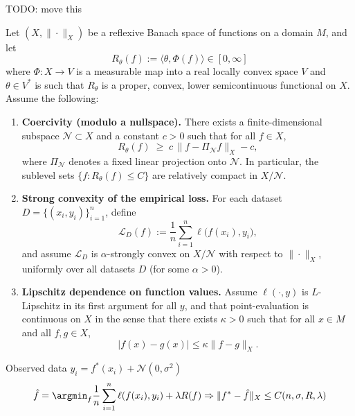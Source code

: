 TODO: move this

\begin{theorem}
	\label{thm:stability-coercive-phi}
	Let $(X,\|\cdot\|_X)$ be a reflexive Banach space of functions on a domain $M$, and let
	\[
		R_\theta(f) := \langle \theta, \Phi(f) \rangle \in [0,\infty]
	\]
	where $\Phi:X\to V$ is a measurable map into a real locally convex space $V$ and $\theta\in V^\ast$ is such that $R_\theta$ is a proper, convex, lower semicontinuous functional on $X$.
	Assume the following:

	\begin{enumerate}
		\item \textbf{Coercivity (modulo a nullspace).}
		      There exists a finite-dimensional subspace $\mathcal N\subset X$ and a constant $c>0$ such that for all $f\in X$,
		      \[
			      R_\theta(f) \;\ge\; c\,\|f-\Pi_{\mathcal N}f\|_X - c,
		      \]
		      where $\Pi_{\mathcal N}$ denotes a fixed linear projection onto $\mathcal N$.
		      In particular, the sublevel sets $\{f: R_\theta(f)\le C\}$ are relatively compact in $X/\mathcal N$.

		\item \textbf{Strong convexity of the empirical loss.}
		      For each dataset $D=\{(x_i,y_i)\}_{i=1}^n$, define
		      \[
			      \mathcal L_D(f):=\frac{1}{n}\sum_{i=1}^n \ell\big(f(x_i),y_i\big),
		      \]
		      and assume $\mathcal L_D$ is $\alpha$-strongly convex on $X/\mathcal N$ with respect to $\|\cdot\|_X$, uniformly over all datasets $D$ (for some $\alpha>0$).

		\item \textbf{Lipschitz dependence on function values.}
		      Assume $\ell(\cdot,y)$ is $L$-Lipschitz in its first argument for all $y$, and that point-evaluation is continuous on $X$ in the sense that there exists $\kappa>0$ such that for all $x\in M$ and all $f,g\in X$,
		      \[
			      |f(x)-g(x)| \le \kappa \|f-g\|_X.
		      \]
	\end{enumerate}


	Observed data $y_i = f^*(x_i) + \mathcal{N}(0, \sigma^2)$
	\begin{align*}
		\hat f = \argmin_f \frac{1}{n}\sum_{i=1}^n \ell(f(x_i), y_i) + \lambda R(f) \Rightarrow
		\|f^* - \hat f\|_{X} \leq C(n, \sigma, R, \lambda)
	\end{align*}

\end{theorem}
